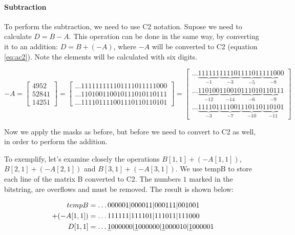 \documentclass[12pt]{article}
\begin{document}
\paragraph{Subtraction}
To perform the subtraction, we need to use C2 notation. Supose  we need to
calculate $D = B - A$. This operation can be done in the same way, by
converting it to an addition: $D = B + (-A)$, where $-A$ will be converted to
C2 (equation \ref{eq:ac2}). Note the elements will be calculated with six
digits.

\begin{equation}\label{eq:ac2}
	-A = \begin{bmatrix}
			4952\\ 
			52841\\ 
			14251
		\end{bmatrix} 
        =
        \begin{bmatrix}
   			\ldots111111111101111011111000\\ 
			\ldots110100110010111010110111\\ 
			\ldots111101111001110110110101
		\end{bmatrix}
        =
        \begin{bmatrix}
 \ldots\underbrace{111111}_{-1}\underbrace{111101}_{-3}\underbrace{111011}_{-5}
\underbrace{111000}_{-8}\\
\ldots\underbrace{110100}_{-12}\underbrace{110010}_{-14}\underbrace{111010}_{-6}
\underbrace{110111}_{-9}\\
\ldots\underbrace{111101}_{-3}\underbrace{111001}_{-7}\underbrace{110110}_{-10}
\underbrace{110101}_{-11}
		\end{bmatrix}
\end{equation}

Now we apply the masks as before, but before we need to convert to C2 as well,
in order to perform the addition.

To exemplify, let's examine closely the operations $B[1,1] + (-A[1,1])$,
$B[2,1] + (-A[2,1])$ and $B[3,1] + (-A[3,1])$. We use tempB to store each line
of the matrix B converted to C2. The numbers $1$ marked in the bitstring, are
overflows and must be removed. The result is shown below:

\begin{align*}
	tempB	&=\ldots000001|000011|000111|001001\\
+(-A[1,1])	&=\ldots111111|111101|111011|111000\\
	D[1,1]
&=\ldots\sout{1}000000|\sout{1}000000|\sout{1}000010|\sout{1}000001
\end{align*}
\end{document}
